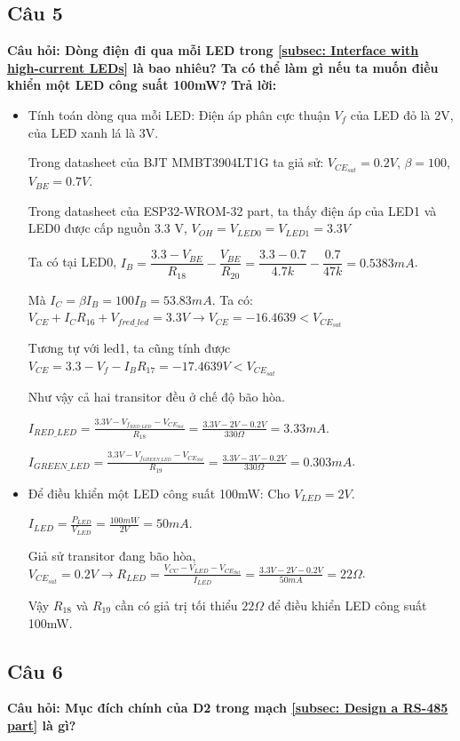 \subsection{Câu 5}
 \textbf{Câu hỏi: Dòng điện đi qua mỗi LED trong \ref{subsec: Interface with high-current LEDs} là bao nhiêu? Ta có thể làm gì nếu ta muốn điều khiển một LED công suất 100mW?}
\textbf{Trả lời:}
\begin{itemize}
    \item Tính toán dòng qua mỗi LED:
     Điện áp phân cực thuận $V_f$ của LED đỏ là 2V, của LED xanh lá là 3V.

    Trong datasheet của BJT MMBT3904LT1G ta giả sử: $V_{CE_{sat}} = 0.2V$, $\beta = 100$, $V_{BE} = 0.7 V$.
    
    Trong datasheet của ESP32-WROM-32 part, ta thấy điện áp của LED1 và LED0 được cấp nguồn 3.3 V, $V_{OH} = V_{LED0} = V_{LED1} = 3.3V$
    
    Ta có tại LED0, $I_B = \dfrac{3.3 - V_{BE}}{R_{18}} - \dfrac{V_{BE}}{R_{20}} = \dfrac{3.3 - 0.7}{4.7k} - \dfrac{0.7}{47k} = 0.5383 mA$.

    Mà $I_C = \beta I_B = 100 I_B = 53.83 mA$. Ta có: $V_{CE} + I_CR_{16} + V_{f{red\_led}} = 3.3 V \rightarrow V_{CE} = -16.4639 < V_{CE_{sat}}$

    Tương tự với led1, ta cũng tính được $V_{CE} = 3.3 - V_{f} - I_BR_{17} = -17.4639 V < V_{CE_{sat}}$

    Như vậy cả hai transitor đều ở chế độ bão hòa.

     $I_{RED\_LED} = \frac{3.3V - V_{f_{RED\_LED}} - V_{CE_{Sat}}}{R_{18}} = \frac{3.3V - 2V - 0.2V}{330\Omega} = 3.33mA$.
     
     $I_{GREEN\_LED} = \frac{3.3V - V_{f_{GREEN\_LED}} - V_{CE_{Sat}}}{R_{19}} = \frac{3.3V - 3V - 0.2V}{330\Omega} = 0.303mA$.
    \item Để điều khiển một LED công suất 100mW:
        Cho $V_{LED} = 2V$.

        $I_{LED} = \frac{P_{LED}}{V_{LED}} = \frac{100mW}{2V} = 50mA$.

Giả sử transitor đang bão hòa, $V_{CE_{sat}} = 0.2 V \rightarrow R_{LED} = \frac{V_{CC} - V_{LED} - V_{CE_{Sat}}}{I_{LED}} = \frac{3.3V - 2V - 0.2V}{50mA} = 22\Omega$.
        
        Vậy $R_{18}$ và $R_{19}$ cần có giả trị tối thiểu $22\Omega$ để điều khiển LED công suất 100mW.
\end{itemize}
\subsection{Câu 6}
\textbf{Câu hỏi: Mục đích chính của D2 trong mạch \ref{subsec: Design a RS-485 part} là gì?}

